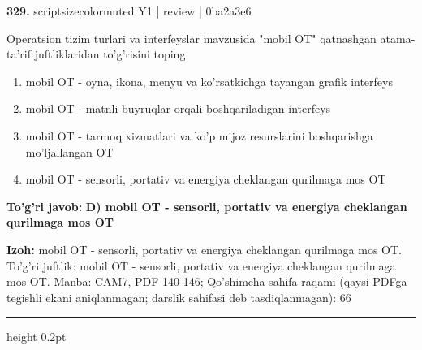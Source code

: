 \documentclass[10pt,a4paper]{article}
\begin{document}
{\bfseries\sffamily\color{ink} 329.} {scriptsizecolor{muted} Y1 | review | 0ba2a3e6}
\par
Operatsion tizim turlari va interfeyslar mavzusida "mobil OT" qatnashgan atama-ta'rif juftliklaridan to'g'risini toping.
\begin{enumerate}[label=\Alph*),leftmargin=9mm]
\item mobil OT - oyna, ikona, menyu va ko'rsatkichga tayangan grafik interfeys
\item mobil OT - matnli buyruqlar orqali boshqariladigan interfeys
\item mobil OT - tarmoq xizmatlari va ko'p mijoz resurslarini boshqarishga mo'ljallangan OT
\item mobil OT - sensorli, portativ va energiya cheklangan qurilmaga mos OT
\end{enumerate}
\begin{tcolorbox}[enhanced,breakable,colback=teal!4,colframe=teal!60!black,boxrule=0.45pt,arc=1.2mm,left=2.7mm,right=2.7mm,top=1.8mm,bottom=1.8mm,before skip=2mm,after skip=2mm]
{\bfseries\sffamily\color{teal}To'g'ri javob:} \textbf{D) mobil OT - sensorli, portativ va energiya cheklangan qurilmaga mos OT}
\par\smallskip
{\bfseries Izoh:} mobil OT - sensorli, portativ va energiya cheklangan qurilmaga mos OT. To'g'ri juftlik: mobil OT - sensorli, portativ va energiya cheklangan qurilmaga mos OT. Manba: CAM7, PDF 140-146; Qo'shimcha sahifa raqami (qaysi PDFga tegishli ekani aniqlanmagan; darslik sahifasi deb tasdiqlanmagan): 66
\end{tcolorbox}
\vspace{2mm}\hrule height 0.2pt\vspace{3mm}
\end{document}
